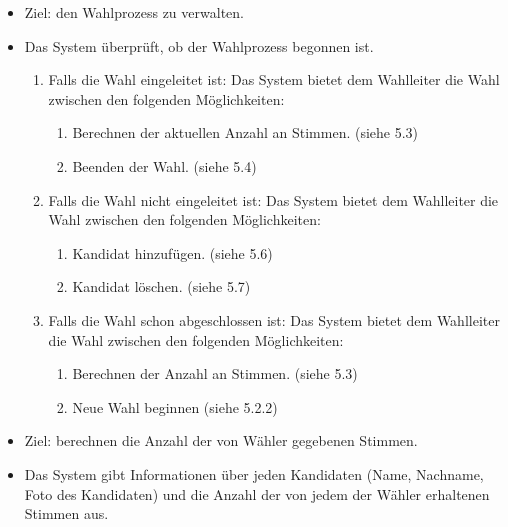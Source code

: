 \documentclass[parskip=full,11pt,twoside]{scrartcl}
\begin{document}
\begin{itemize}
	\item Ziel: den Wahlprozess zu verwalten.
	\item Das System überprüft, ob der Wahlprozess begonnen ist.   
	\begin{enumerate}
		\item Falls die Wahl eingeleitet ist: Das System bietet dem Wahlleiter die Wahl zwischen den folgenden Möglichkeiten:
		\begin{enumerate}
			\item Berechnen der aktuellen Anzahl an Stimmen. (siehe 5.3)
			\item Beenden der Wahl. (siehe 5.4)
		\end{enumerate}
		\item Falls die Wahl nicht eingeleitet ist: Das System bietet dem Wahlleiter die Wahl zwischen den folgenden Möglichkeiten:
		\begin{enumerate}
			\item Kandidat hinzufügen. (siehe 5.6)
			\item Kandidat löschen. (siehe 5.7)
		\end{enumerate}
		\item Falls die Wahl schon abgeschlossen ist: Das System bietet dem Wahlleiter die Wahl zwischen den folgenden Möglichkeiten:
		\begin{enumerate}
			\item Berechnen der Anzahl an Stimmen. (siehe 5.3)
			\item Neue Wahl beginnen (siehe 5.2.2)
		\end{enumerate}
	\end{enumerate}
\end{itemize}

\begin{itemize}
	\item Ziel: berechnen die Anzahl der von Wähler gegebenen Stimmen.
	\item Das System gibt Informationen über jeden Kandidaten (Name, Nachname, Foto des Kandidaten) und die Anzahl der von jedem der Wähler erhaltenen Stimmen aus.
\end{itemize}
\end{document}
